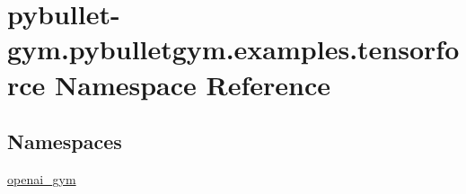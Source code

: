 \hypertarget{namespacepybullet-gym_1_1pybulletgym_1_1examples_1_1tensorforce}{}\section{pybullet-\/gym.pybulletgym.\+examples.\+tensorforce Namespace Reference}
\label{namespacepybullet-gym_1_1pybulletgym_1_1examples_1_1tensorforce}
\subsection*{Namespaces}
\begin{DoxyCompactItemize}
\item 
 \hyperlink{namespacepybullet-gym_1_1pybulletgym_1_1examples_1_1tensorforce_1_1openai__gym}{openai\+\_\+gym}
\end{DoxyCompactItemize}
